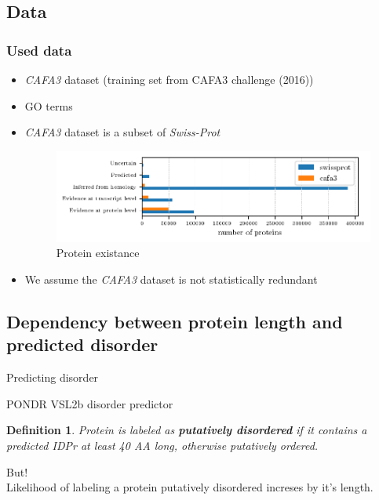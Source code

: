\documentclass{beamer}
\newcommand{\keyword}[1]{\textbf{#1}}
\newcommand{\swissprot}{\textit{Swiss-Prot} }
\newtheorem{definicija}{Definition}
\begin{document}
\subsection{Data}
\begin{frame}
  \frametitle{Used data}

  \begin{itemize}
    \item \textit{CAFA3} dataset (training set from CAFA3 challenge (2016))
      \pause
    \item GO terms
      \pause
    \item \textit{CAFA3} dataset is a subset of \swissprot
      \pause
      \begin{figure}
        \centering 
        \hspace*{-0.5cm} 
        \includegraphics[scale=0.8]{plots/cafa3_pe}
        \vspace*{-0.5cm} 
        \caption{Protein existance}
      \end{figure}

      \pause
    \item We assume the \textit{CAFA3} dataset is not statistically redundant
  \end{itemize}


\end{frame}




\subsection{Dependency between protein length and predicted disorder }

\begin{frame}{Predicting disorder}

  PONDR VSL2b disorder predictor
  \pause

  \begin{definicija}
    \label{pdis_def}
    Protein is labeled as \keyword{putatively disordered} if it contains a
    predicted IDPr at least 40 AA long, otherwise putatively ordered.
  \end{definicija}


  \pause
  {\huge
  But! \\}
  Likelihood of labeling a protein putatively disordered increses by it's length.

\end{frame}
\end{document}
